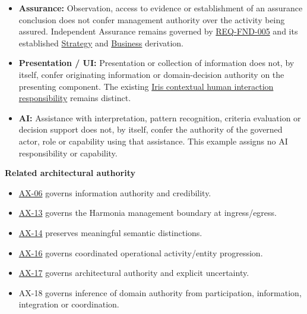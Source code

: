 \begin{itemize}
\item \textbf{Assurance:} Observation, access to evidence or establishment of an
  assurance conclusion does not confer management authority over the activity
  being assured. Independent Assurance remains governed by
  \hyperref[element:bbb7438e78604308abba93afc14f4e2e]{REQ-FND-005}
  and its established
  \href{\detokenize{../../../../../docs/markdown/02-strategy/capability-maps/health-service-assurance-derivation.md}}{Strategy}
  and \href{\detokenize{../../../../../docs/markdown/03-business-architecture/behaviours/health-service-assurance.md}}{Business}
  derivation.

\item \textbf{Presentation / UI:} Presentation or collection of information does not,
  by itself, confer originating information or domain-decision authority on
  the presenting component. The existing
  \href{\detokenize{../../../../../docs/markdown/02-strategy/strategic-views/logical-component-responsibilities.md#component-6-iris-contextual-human-interaction}}{Iris contextual human interaction responsibility}
  remains distinct.

\item \textbf{AI:} Assistance with interpretation, pattern recognition, criteria
  evaluation or decision support does not, by itself, confer the authority of
  the governed actor, role or capability using that assistance. This example
  assigns no AI responsibility or capability.

\end{itemize}


\par\medskip\textbf{Related architectural authority}\par


\begin{itemize}


\item \hyperref[element:952c3b6148ce4fce94b69f99a0c2fec7]{AX-06} governs information authority and credibility.

\item \hyperref[element:b6a55decfeec4f1bb3d7f18534a2ffea]{AX-13} governs the Harmonia management boundary at ingress/egress.

\item \hyperref[element:d3fc6025dc7646d1b2020b51f7a44bfa]{AX-14} preserves meaningful semantic distinctions.

\item \hyperref[element:de7e90f46127455a9ec9ad3b9b48ba54]{AX-16} governs coordinated operational activity/entity progression.

\item \hyperref[element:8882573df7ce43c6bc0f66da0a676139]{AX-17} governs architectural authority and explicit uncertainty.

\item AX-18 governs inference of domain authority from participation, information,
  integration or coordination.

\end{itemize}

